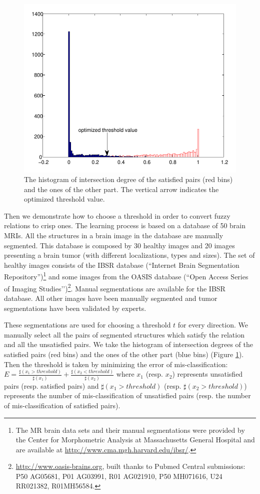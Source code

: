 \documentclass{article}
\begin{document}
\begin{figure}[h]
 \centering
 \includegraphics[width=.5\textwidth]{./figures/right_nright_arrowthresh_crop.pdf}
 \caption{\label{fig:thresh}The histogram of intersection degree of the satisfied pairs (red bins) and the ones of the other part. The vertical arrow indicates the optimized threshold value.}
\end{figure}

Then we demonstrate how to choose a threshold in order to convert fuzzy relations to crisp ones.
The learning process is based on a database of 50 brain MRIs. All the structures in a brain image in the database are manually segmented. 
This database is composed by 30 healthy images and 20 images presenting a brain tumor (with different localizations, types and sizes). 
The set of healthy images consists of the IBSR database (``Internet Brain Segmentation Repository'')\footnote{The MR brain data sets and their manual
segmentations were provided by the Center for Morphometric Analysis at Massachusetts General Hospital and are available at \url{http://www.cma.mgh.harvard.edu/ibsr/}.}
and some images from the OASIS database (``Open Access Series of Imaging Studies’’)\footnote{\url{http://www.oasis-brains.org}, built thanks to Pubmed Central submissions: P50
AG05681, P01 AG03991, R01 AG021910, P50 MH071616, U24 RR021382, R01MH56584.}. Manual segmentations are available for the IBSR database.
All other images have been manually segmented and tumor segmentations have been validated by experts.

These segmentations are used for choosing a threshold $t$ for every direction.
We manually select all the pairs of segmented structures which satisfy the relation and all the unsatisfied pairs.
We take the histogram of intersection degrees of the satisfied pairs (red bins) and the ones of the other part (blue bins) (Figure \ref{fig:thresh}).
Then the threshold is taken by minimizing the error of mis-classification:
$E=\frac{\sharp(x_1>threshold)}{\sharp(x_1)}+\frac{\sharp(x_2<threshold)}{\sharp(x_2)}$ where $x_1$ (resp. $x_2$) represents unsatisfied pairs (resp. satisfied pairs) 
and $\sharp(x_1>threshold)$ (resp. $\sharp(x_2>threshold)$) represents the number of mis-classification of unsatisfied pairs (resp. the number of mis-classification of satisfied pairs).
\end{document}
